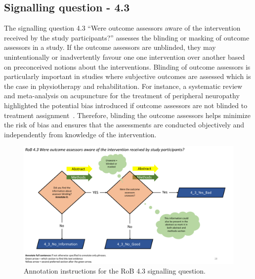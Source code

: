 \documentclass[sn-mathphys,Numbered]{sn-jnl}%
\begin{document}
\subsection*{Signalling question - 4.3 }
\label{subsec:4_3}
%
The signalling question 4.3 ``Were outcome assessors aware of the intervention received by the study participants?'' assesses the blinding or masking of outcome assessors in a study.
If the outcome assessors are unblinded, they may unintentionally or inadvertently favour one one intervention over another based on preconceived notions about the interventions.
Blinding of outcome assessors is particularly important in studies where subjective outcomes are assessed which is the case in physiotherapy and rehabilitation.
For instance, a systematic review and meta-analysis on acupuncture for the treatment of peripheral neuropathy highlighted the potential bias introduced if outcome assessors are not blinded to treatment assignment~\cite{dimitrova2017acupuncture}.
Therefore, blinding the outcome assessors helps minimize the risk of bias and ensures that the assessments are conducted objectively and independently from knowledge of the intervention.
%
%
%
\begin{figure}[hbt]
    \centering
    \includegraphics[width=\textwidth]{figures/4_3.pdf}
    \caption{Annotation instructions for the RoB 4.3 signalling question.}
    \label{fig:4_3}
\end{figure}
%
%
%
\end{document}

